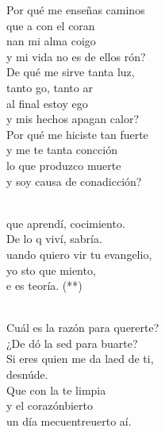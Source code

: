 \begin{cancion}%
	Por qué me enseñas caminos \\
	que a con el coran \\
	nan mi alma coigo\\
	y mi vida no es de ellos rón?\\
	De qué me sirve tanta luz, \\
	tanto go, tanto ar\\
	al final estoy ego \\
	y mis hechos apagan  calor?\\
	Por qué me hiciste tan fuerte \\
	y me te tanta concción\\
	lo que produzco  muerte \\
	y soy causa de conadicción?\\\jump\\
	\begin{chorus}%
	que aprendí, cocimiento. \\
	De lo q viví, sabría.\\
	uando quiero vir tu evangelio, \\
	yo sto que miento,\\
	e es teoría. (**)\\
	\end{chorus}%
	\jump\\
	Cuál es la razón para quererte?\\
	¿De dó la sed para buarte? \\
	Si eres  quien me da laed de ti, \\
	desnúde.\\
	Que con la te limpia \\
	y el corazónbierto\\
	un día mecuentreuerto aí.\\\jump\\
	\begin{chorus}%

\end{chorus}
\end{cancion}
